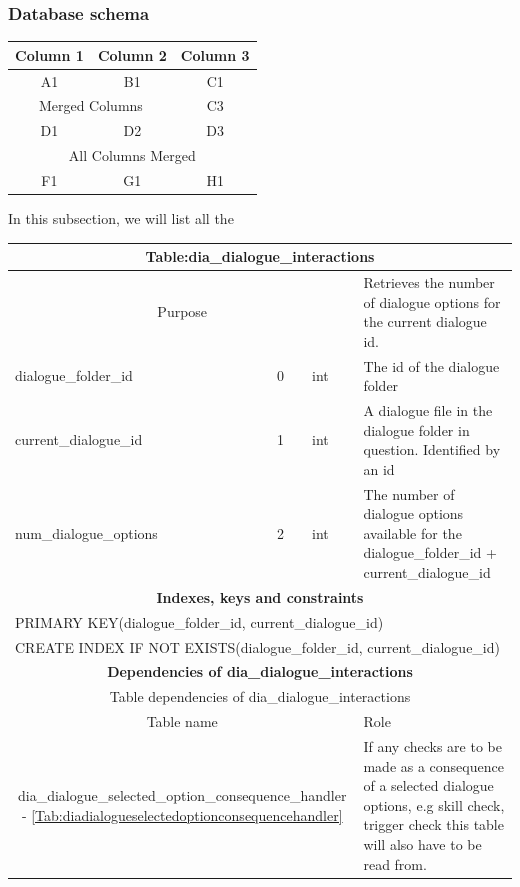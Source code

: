 \documentclass{report}
\begin{document}
\subsubsection*{Database schema}
\begin{tabular}{|c|c|c|}
\hline
Column 1 & Column 2 & Column 3 \\ \hline
A1 & B1 & C1 \\ \hline
\multicolumn{2}{|c|}{Merged Columns} & C3 \\ \hline
D1 & D2 & D3 \\ \hline
\multicolumn{3}{|c|}{All Columns Merged} \\ \hline
F1 & G1 & H1 \\ \hline
\end{tabular}
In this subsection, we will list all the 
\begin{table}[h]
\begin{tabular}{ |p{4cm}|p{1.2cm}|p{3cm}|p{3cm}|  }
\hline
 \multicolumn{4}{|c|}{\textbf{Table:dia\_dialogue\_interactions}} \\
 \hline
  \multicolumn{3}{|c|}{Purpose} & {Retrieves the number of dialogue options for the current dialogue id.} \\
  \hline
 dialogue\_folder\_id & 0 & int & The id of the dialogue folder \\
 current\_dialogue\_id & 1 & int & A dialogue file in the dialogue folder in question. Identified by an id\\
 num\_dialogue\_options & 2 & int & The number of dialogue options available for the dialogue\_folder\_id + current\_dialogue\_id \\
 \hline
  \multicolumn{4}{|c|}{\textbf{Indexes, keys and constraints}} \\
   \hline
   \multicolumn{4}{|p{5cm}|}{PRIMARY KEY(dialogue{\_}folder{\_}id, current{\_}dialogue{\_}id)} \\
      \multicolumn{4}{|p{5cm}|}{CREATE INDEX IF NOT EXISTS(dialogue{\_}folder{\_}id, current{\_}dialogue{\_}id)} \\
 \hline
\multicolumn{4}{|c|}{\textbf{Dependencies of dia\_dialogue\_interactions}}  \\
\hline
\multicolumn{4}{|c|}{Table dependencies of dia\_dialogue\_interactions}  \\
\hline
\multicolumn{3}{|c|}{Table name} & Role \\
\hline
\multicolumn{3}{|c|}{dia\_dialogue\_selected\_option\_consequence\_handler - \ref{Tab:diadialogueselectedoptionconsequencehandler}} & If any checks are to be made as a consequence of a selected dialogue options, e.g skill check, trigger check this table will also have to be read from. \\
\hline
\end{tabular}
\end{table}
\end{document}
